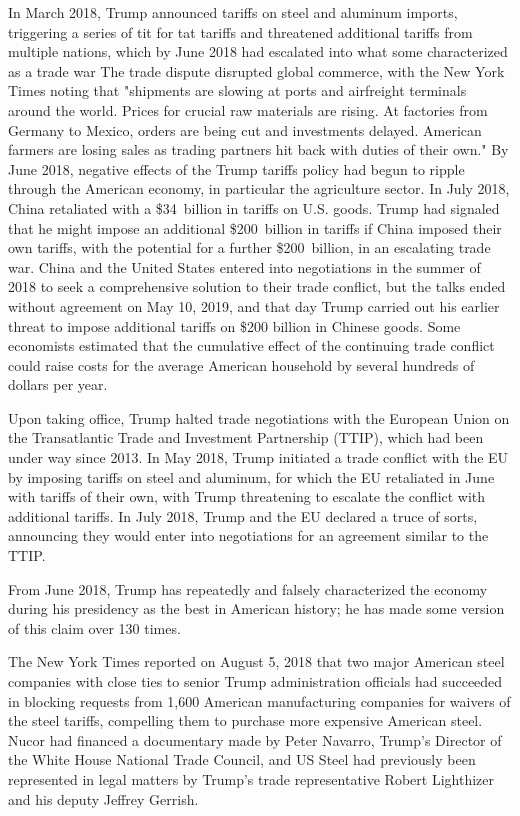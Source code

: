 In March 2018, Trump announced tariffs on steel and aluminum imports,
triggering a series of tit for tat tariffs and threatened additional
tariffs from multiple nations, which by June 2018 had escalated into
what some characterized as a trade war The trade dispute disrupted
global commerce, with the New York Times noting that "shipments are
slowing at ports and airfreight terminals around the world. Prices for
crucial raw materials are rising. At factories from Germany to Mexico,
orders are being cut and investments delayed. American farmers are
losing sales as trading partners hit back with duties of their own." By
June 2018, negative effects of the Trump tariffs policy had begun to
ripple through the American economy, in particular the agriculture
sector. In July 2018, China retaliated with a \$34~billion in tariffs on
U.S. goods. Trump had signaled that he might impose an additional
\$200~billion in tariffs if China imposed their own tariffs, with the
potential for a further \$200~billion, in an escalating trade war. China
and the United States entered into negotiations in the summer of 2018 to
seek a comprehensive solution to their trade conflict, but the talks
ended without agreement on May 10, 2019, and that day Trump carried out
his earlier threat to impose additional tariffs on \$200 billion in
Chinese goods. Some economists estimated that the cumulative effect of
the continuing trade conflict could raise costs for the average American
household by several hundreds of dollars per year.

Upon taking office, Trump halted trade negotiations with the European
Union on the Transatlantic Trade and Investment Partnership (TTIP),
which had been under way since 2013. In May 2018, Trump initiated a
trade conflict with the EU by imposing tariffs on steel and aluminum,
for which the EU retaliated in June with tariffs of their own, with
Trump threatening to escalate the conflict with additional tariffs. In
July 2018, Trump and the EU declared a truce of sorts, announcing they
would enter into negotiations for an agreement similar to the TTIP.

From June 2018, Trump has repeatedly and falsely characterized the
economy during his presidency as the best in American history; he has
made some version of this claim over 130 times.

The New York Times reported on August 5, 2018 that two major American
steel companies with close ties to senior Trump administration officials
had succeeded in blocking requests from 1,600 American manufacturing
companies for waivers of the steel tariffs, compelling them to purchase
more expensive American steel. Nucor had financed a documentary made by
Peter Navarro, Trump's Director of the White House National Trade
Council, and US Steel had previously been represented in legal matters
by Trump's trade representative Robert Lighthizer and his deputy Jeffrey
Gerrish.

